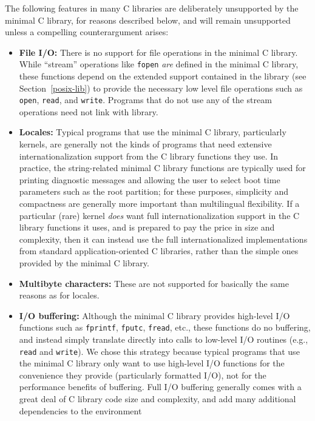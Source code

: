 The following features in many C libraries
are deliberately unsupported by the minimal C library,
for reasons described below,
and will remain unsupported
unless a compelling counterargument arises:
\begin{itemize}
\item   {\bf File I/O:}
	There is no support for file operations in the minimal C
	library. While ``stream'' operations like {\tt fopen} \emph{are}
	defined in the minimal C library, these functions depend on the
	extended \posix{} support contained in the \posix{} library (see
	Section~\ref{posix-lib}) to provide the necessary low level file
	operations such as {\tt open}, {\tt read}, and {\tt write}.
	Programs that do not use any of the stream operations need not
	link with \posix{} library.
\item	{\bf Locales:}
	Typical programs that use the minimal C library,
	particularly kernels,
	are generally not the kinds of programs
	that need extensive internationalization support
	from the C library functions they use.
	In practice, the string-related minimal C library functions
	are typically used for printing diagnostic messages
	and allowing the user to select boot time parameters
	such as the root partition;
	for these purposes, simplicity and compactness
	are generally more important than multilingual flexibility.
	If a particular (rare) kernel \emph{does} want
	full internationalization support in the C library functions it uses,
	and is prepared to pay the price in size and complexity,
	then it can instead use the full internationalized implementations
	from standard application-oriented C libraries,
	rather than the simple ones provided by the minimal C library.
\item	{\bf Multibyte characters:}
	These are not supported for basically the same reasons as for locales.
\item	{\bf I/O buffering:}
	Although the \oskit{} minimal C library
	provides high-level I/O functions
	such as {\tt fprintf}, {\tt fputc}, {\tt fread}, etc.,
	these functions do no buffering,
	and instead simply translate directly
	into calls to low-level I/O routines
	(e.g., {\tt read} and {\tt write}).
	We chose this strategy
	because typical programs that use the minimal C library
	only want to use high-level I/O functions
	for the convenience they provide (particularly formatted I/O),
	not for the performance benefits of buffering.
	Full I/O buffering generally comes with
	a great deal of C library code size and complexity,
	and add many additional dependencies to the environment

\end{itemize}
